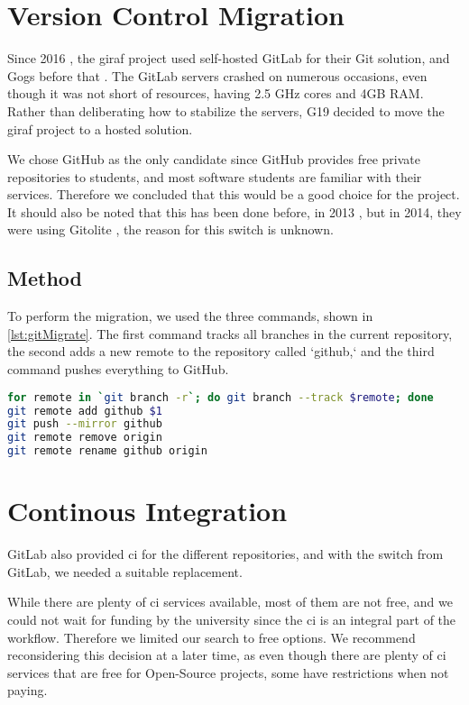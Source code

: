 \section{Version Control Migration} \label{sec:GitAndCI}

Since 2016 \cite{SW611F16}, the \gls{giraf} project used self-hosted GitLab for their Git solution, and Gogs before that \cite{SW603F15}. The GitLab servers crashed on numerous occasions, even though it was not short of resources, having 2.5 GHz cores and 4GB RAM. Rather than deliberating how to stabilize the servers, \gls{G19} decided to move the \gls{giraf} project to a hosted solution.

We chose GitHub as the only candidate since GitHub provides free private repositories to students, and most software students are familiar with their services. Therefore we concluded that this would be a good choice for the project. It should also be noted that this has been done before, in 2013 \cite{SW601F13}, but in 2014, they were using Gitolite \cite{SW613F14}, the reason for this switch is unknown.

\subsection{Method}

To perform the migration, we used the three commands, shown in \autoref{lst:gitMigrate}. The first command tracks all branches in the current repository, the second adds a new remote to the repository called `github,` and the third command pushes everything to GitHub.

\begin{lstlisting}[language=bash,label={lst:gitMigrate},caption={Git Migration code}]
for remote in `git branch -r`; do git branch --track $remote; done
git remote add github $1
git push --mirror github
git remote remove origin
git remote rename github origin
\end{lstlisting}

\section{Continous Integration}

GitLab also provided \gls{ci} for the different repositories, and with the switch from GitLab, we needed a suitable replacement.

While there are plenty of \gls{ci} services available, most of them are not free, and we could not wait for funding by the university since the \gls{ci} is an integral part of the workflow. Therefore we limited our search to free options.  We recommend reconsidering this decision at a later time, as even though there are plenty of \gls{ci} services that are free for Open-Source projects, some have restrictions when not paying.

